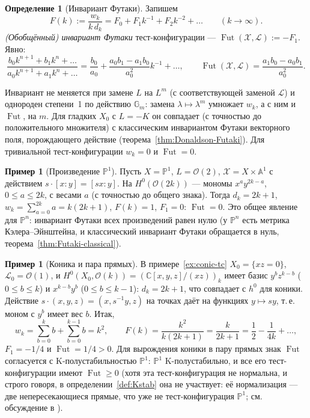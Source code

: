 \documentclass[11pt,a4paper]{article}
\theoremstyle{plain}
\theoremstyle{definition}
\newtheorem{definition}[theorem]{Определение}
\newtheorem{example}[theorem]{Пример}
\theoremstyle{remark}
\renewcommand{\C}{\mathbb{C}}
\newcommand{\PP}{\mathbb{P}}
\newcommand{\A}{\mathbb{A}}
\newcommand{\Gm}{\mathbb{G}_m}
\newcommand{\cO}{\mathcal{O}}
\newcommand{\cL}{\mathcal{L}}
\newcommand{\cX}{\mathcal{X}}
\DeclareMathOperator{\Fut}{Fut}
\begin{document}
\begin{definition}[Инвариант Футаки]\label{def:Futaki}
Запишем
\[
F(k):=\frac{w_k}{k\,d_k}=F_0+F_1k^{-1}+F_2k^{-2}+\dots\qquad(k\to\infty).
\]
\emph{(Обобщённый) инвариант Футаки} тест-конфигурации --- $\Fut(\cX,\cL):=-F_1$. Явно:
\[
\frac{b_0k^{n+1}+b_1k^n+\dots}{a_0k^{n+1}+a_1k^n+\dots}=\frac{b_0}{a_0}+\frac{a_0b_1-a_1b_0}{a_0^2}k^{-1}+\dots,
\qquad\Fut(\cX,\cL)=\frac{a_1b_0-a_0b_1}{a_0^2}.
\]
\end{definition}

Инвариант не меняется при замене $L$ на $L^m$ (с соответствующей заменой $\cL$) и однороден
степени~1 по действию $\Gm$: замена $\lambda\mapsto\lambda^m$ умножает $w_k$, а с ним и $\Fut$,
на $m$. Для гладких
$X_0$ с $L=-K$ он совпадает (с точностью до положительного множителя) с классическим инвариантом
Футаки векторного поля, порождающего действие (теорема~\ref{thm:Donaldson-Futaki}). Для тривиальной
тест-конфигурации $w_k=0$ и $\Fut=0$.

\begin{example}[Произведение $\PP^1$]\label{ex:product-P1}
Пусть $X=\PP^1$, $L=\cO(2)$, $\cX=X\times\A^1$ с действием $s\cdot[x:y]=[sx:y]$. На
$H^0(\cO(2k))$ --- мономы $x^ay^{2k-a}$, $0\le a\le2k$, с весами $a$ (с точностью до общего знака).
Тогда $d_k=2k+1$, $w_k=\sum_{a=0}^{2k}a=k(2k+1)$, $F(k)=1$, $F_1=0$: $\Fut=0$. Это общее явление
для $\PP^n$: инвариант Футаки всех произведений равен нулю (у $\PP^n$ есть метрика Кэлера--Эйнштейна, и классический
инвариант Футаки обращается в нуль, теорема~\ref{thm:Futaki-classical}).
\end{example}

\begin{example}[Коника и пара прямых]\label{ex:conic-Futaki}
В примере~\ref{ex:conic-tc} $X_0=\{xz=0\}$, $\cL_0=\cO(1)$, и
$H^0(X_0,\cO(k))=(\C[x,y,z]/(xz))_k$ имеет базис $y^bz^{k-b}$ ($0\le b\le k$) и $x^{k-b}y^b$
($0\le b\le k-1$): $d_k=2k+1$, что совпадает с $h^0$ для коники. Действие
$s\cdot(x,y,z)=(x,s^{-1}y,z)$ на точках даёт на функциях $y\mapsto sy$, т.\,е. моном с $y^b$ имеет
вес $b$. Итак,
\[
w_k=\sum_{b=0}^kb+\sum_{b=0}^{k-1}b=k^2,\qquad F(k)=\frac{k^2}{k(2k+1)}=\frac k{2k+1}=\frac12-\frac1{4k}+\dots,
\]
$F_1=-1/4$ и $\Fut=1/4>0$. Для вырождения коники в пару прямых знак $\Fut$ согласуется с K-полустабильностью $\PP^1$:
$\PP^1$ K-полустабильно, и все его тест-конфигурации имеют $\Fut\ge0$ (хотя эта тест-конфигурация
не нормальна, и строго говоря, в определении~\ref{def:Kstab} она не участвует: её нормализация ---
две непересекающиеся прямые, что уже не тест-конфигурация $\PP^1$; см. обсуждение в \cite[2.1]{Xu}).
\end{example}
\end{document}
